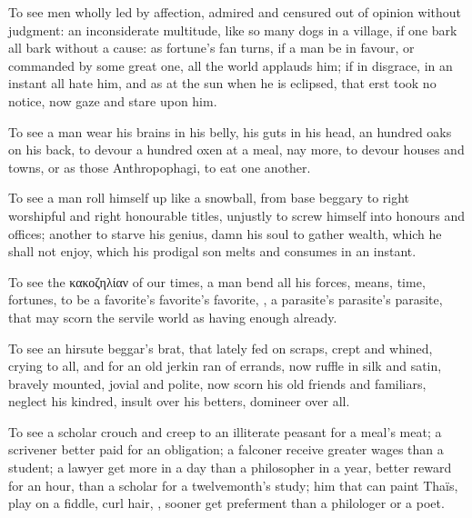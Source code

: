 {To see men wholly led by affection, admired and censured out of opinion
without judgment: an inconsiderate multitude, like so many dogs in a
village, if one bark all bark without a cause: as fortune's fan turns,
if a man be in favour, or commanded by some great one, all the world
applauds him; if in disgrace, in an instant all hate him, and as
at the sun when he is eclipsed, that erst took no notice, now gaze and
stare upon him.

To see a man wear his brains in his belly, his guts in his head,
an hundred oaks on his back, to devour a hundred oxen at a meal, nay
more, to devour houses and towns, or as those Anthropophagi, to
eat one another.

To see a man roll himself up like a snowball, from base beggary to
right worshipful and right honourable titles, unjustly to screw himself
into honours and offices; another to starve his genius, damn his soul
to gather wealth, which he shall not enjoy, which his prodigal son
melts and consumes in an instant. 

To see the \textgreek{κακοζηλίαν} of our times, a man bend all his forces, means,
time, fortunes, to be a favorite's favorite's favorite, \etc{}, a
parasite's parasite's parasite, that may scorn the servile world as
having enough already.

To see an hirsute beggar's brat, that lately fed on scraps, crept and
whined, crying to all, and for an old jerkin ran of errands, now ruffle
in silk and satin, bravely mounted, jovial and polite, now scorn his
old friends and familiars, neglect his kindred, insult over his
betters, domineer over all.

To see a scholar crouch and creep to an illiterate peasant for a meal's
meat; a scrivener better paid for an obligation; a falconer receive
greater wages than a student; a lawyer get more in a day than a
philosopher in a year, better reward for an hour, than a scholar for a
twelvemonth's study; him that can paint Thaïs, play on a fiddle,
curl hair, \etc{}, sooner get preferment than a philologer or a poet.

}
